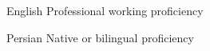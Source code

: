 

\begin{cvskills}

  \cvskill
    {English} %
    {Professional working proficiency} %
    
  \cvskill
    {Persian} %
    {Native or bilingual proficiency} %

\end{cvskills}

